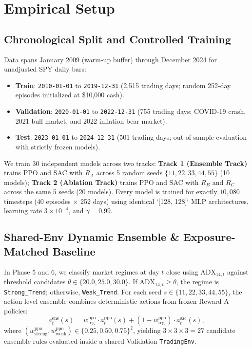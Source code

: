 \documentclass[10pt,twocolumn,conference]{IEEEtran}
\begin{document}
\section{Empirical Setup}

\subsection{Chronological Split and Controlled Training}
Data spans January 2009 (warm-up buffer) through December 2024 for unadjusted SPY daily bars:
\begin{itemize}
    \item \textbf{Train}: \texttt{2010-01-01} to \texttt{2019-12-31} (2,515 trading days; random 252-day episodes initialized at \$10,000 cash).
    \item \textbf{Validation}: \texttt{2020-01-01} to \texttt{2022-12-31} (755 trading days; COVID-19 crash, 2021 bull market, and 2022 inflation bear market).
    \item \textbf{Test}: \texttt{2023-01-01} to \texttt{2024-12-31} (501 trading days; out-of-sample evaluation with strictly frozen models).
\end{itemize}

We train 30 independent models across two tracks: \textbf{Track 1 (Ensemble Track)} trains PPO and SAC with $R_A$ across 5 random seeds $\{11, 22, 33, 44, 55\}$ (10 models); \textbf{Track 2 (Ablation Track)} trains PPO and SAC with $R_B$ and $R_C$ across the same 5 seeds (20 models). Every model is trained for exactly $10,080$ timesteps (40 episodes $\times$ 252 days) using identical `[128, 128]` MLP architectures, learning rate $3\times 10^{-4}$, and $\gamma = 0.99$.

\subsection{Shared-Env Dynamic Ensemble \& Exposure-Matched Baseline}
In Phase 5 and 6, we classify market regimes at day $t$ close using $\text{ADX}_{14,t}$ against threshold candidates $\theta \in \{20.0, 25.0, 30.0\}$. If $\text{ADX}_{14,t} \ge \theta$, the regime is \texttt{Strong\_Trend}; otherwise, \texttt{Weak\_Trend}. For each seed $s \in \{11,22,33,44,55\}$, the action-level ensemble combines deterministic actions from frozen Reward A policies:
\begin{equation}
    a_t^{\text{ens}}(s) = w_{\text{reg}}^{\text{ppo}} \cdot a_t^{\text{ppo}}(s) + (1 - w_{\text{reg}}^{\text{ppo}}) \cdot a_t^{\text{sac}}(s),
\end{equation}
where $(w_{\text{strong}}^{\text{ppo}}, w_{\text{weak}}^{\text{ppo}}) \in \{0.25, 0.50, 0.75\}^2$, yielding $3 \times 3 \times 3 = 27$ candidate ensemble rules evaluated inside a shared Validation \texttt{TradingEnv}.
\end{document}

